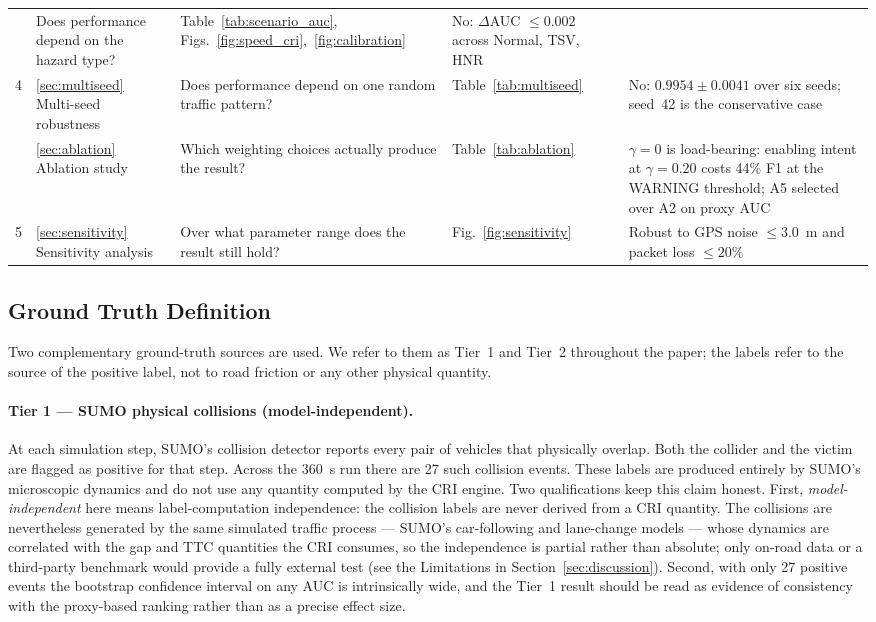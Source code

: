 \documentclass[sn-mathphys-num,Numbered,iicol]{sn-jnl}
\begin{document}
\begin{table}[htbp]
\begin{tabular}{@{}cp{2.4cm}p{4.0cm}p{2.5cm}p{4.4cm}@{}}
      & Does performance depend on the hazard type?
      & Table~\ref{tab:scenario_auc}, Figs.~\ref{fig:speed_cri},~\ref{fig:calibration}
      & No: $\Delta$AUC $\le 0.002$ across Normal, TSV, HNR \\
    4 & \ref{sec:multiseed} Multi-seed robustness
      & Does performance depend on one random traffic pattern?
      & Table~\ref{tab:multiseed}
      & No: $0.9954 \pm 0.0041$ over six seeds; seed~42 is the conservative case \\
    \addlinespace
    5 & \ref{sec:ablation} Ablation study
      & Which weighting choices actually produce the result?
      & Table~\ref{tab:ablation}
      & $\gamma = 0$ is load-bearing: enabling intent at $\gamma = 0.20$ costs 44\% F1 at the WARNING threshold; A5 selected over A2 on proxy AUC \\
    5 & \ref{sec:sensitivity} Sensitivity analysis
      & Over what parameter range does the result still hold?
      & Fig.~\ref{fig:sensitivity}
      & Robust to GPS noise $\le 3.0$~m and packet loss $\le 20\%$ \\
    \bottomrule
  \end{tabular}
\end{table}

\subsection{Ground Truth Definition}\label{sec:gt}
Two complementary ground-truth sources are used. We refer to them as Tier~1 and Tier~2 throughout the paper; the labels refer to the source of the positive label, not to road friction or any other physical quantity.

\paragraph{Tier 1 --- SUMO physical collisions (model-independent).}
At each simulation step, SUMO's collision detector reports every pair of vehicles that physically overlap. Both the collider and the victim are flagged as positive for that step. Across the 360~s run there are 27 such collision events. These labels are produced entirely by SUMO's microscopic dynamics and do not use any quantity computed by the CRI engine. Two qualifications keep this claim honest. First, \emph{model-independent} here means label-computation independence: the collision labels are never derived from a CRI quantity. The collisions are nevertheless generated by the same simulated traffic process --- SUMO's car-following and lane-change models --- whose dynamics are correlated with the gap and TTC quantities the CRI consumes, so the independence is partial rather than absolute; only on-road data or a third-party benchmark would provide a fully external test (see the Limitations in Section~\ref{sec:discussion}). Second, with only 27 positive events the bootstrap confidence interval on any AUC is intrinsically wide, and the Tier~1 result should be read as evidence of consistency with the proxy-based ranking rather than as a precise effect size.
\end{document}
